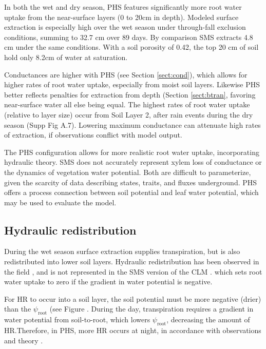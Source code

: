 \documentclass[draft,linenumbers]{agujournal}
\begin{document}
    In both the wet and dry season, PHS features significantly more root water uptake from the near-surface layers (0 to 20cm in depth). Modeled surface extraction is especially high over the wet season under through-fall exclusion conditions, summing to 32.7 cm over 89 days. By comparison SMS extracts 4.8 cm under the same conditions. With a soil porosity of 0.42, the top 20 cm of soil hold only 8.2cm of water at saturation.
    
    Conductances are higher with PHS (see Section \ref{sect:cond}), which allows for higher rates of root water uptake, especially from moist soil layers. Likewise PHS better reflects penalties for extraction from depth (Section \ref{sect:btran}, favoring near-surface water all else being equal. The highest rates of root water uptake (relative to layer size) occur from Soil Layer 2, after rain events during the dry season (Supp Fig A.7). Lowering maximum conductance can attenuate high rates of extraction, if observations conflict with model output.

    The PHS configuration allows for more realistic root water uptake, incorporating hydraulic theory. SMS does not accurately represent xylem loss of conductance or the dynamics of vegetation water potential. Both are difficult to parameterize, given the scarcity of data describing states, traits, and fluxes underground. PHS offers a process connection between soil potential and leaf water potential, which may be used to evaluate the model.

\subsection{Hydraulic redistribution}

    During the wet season surface extraction supplies transpiration, but is also redistributed into lower soil layers. Hydraulic redistribution has been observed in the field \citep{oliveira2005}, and is not represented in the SMS version of the CLM \citep{lee2005}. which sets root water uptake to zero if the gradient in water potential is negative. 
    
    
    For HR to occur into a soil layer, the soil potential must be more negative (drier) than the $\psi_{\text{root}}$ (see Figure . During the day, transpiration requires a gradient in water potential from soil-to-root, which lowers $\psi_{\text{root}}$, decreasing the amount of HR.Therefore, in PHS, more HR occurs at night, in accordance with observations and theory \citep{oliveira2005,lee2005}.
    
\end{document}

